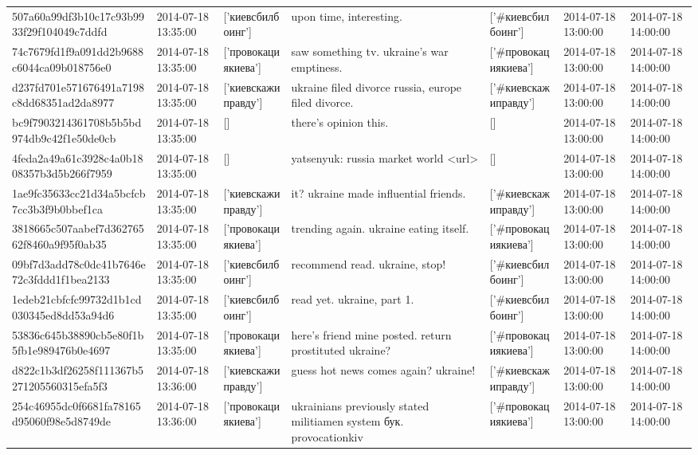\begin{tabular}{lllllll}
507a60a99df3b10c17c93b9933f29f104049c7ddfd & 2014-07-18 13:35:00 & ['киевсбилбоинг'] & upon time, interesting. & ['#киевсбилбоинг'] & 2014-07-18 13:00:00 & 2014-07-18 14:00:00 \\
74c7679fd1f9a091dd2b9688c6044ca09b018756e0 & 2014-07-18 13:35:00 & ['провокациякиева'] & saw something tv. ukraine's war emptiness. & ['#провокациякиева'] & 2014-07-18 13:00:00 & 2014-07-18 14:00:00 \\
d237fd701e571676491a7198c8dd68351ad2da8977 & 2014-07-18 13:35:00 & ['киевскажиправду'] & ukraine filed divorce russia, europe filed divorce. & ['#киевскажиправду'] & 2014-07-18 13:00:00 & 2014-07-18 14:00:00 \\
bc9f7903214361708b5b5bd974db9c42f1e50de0cb & 2014-07-18 13:35:00 & [] & there's opinion this. & [] & 2014-07-18 13:00:00 & 2014-07-18 14:00:00 \\
4feda2a49a61c3928c4a0b1808357b3d5b266f7959 & 2014-07-18 13:35:00 & [] & yatsenyuk: russia market world <url> & [] & 2014-07-18 13:00:00 & 2014-07-18 14:00:00 \\
1ae9fc35633cc21d34a5bcfcb7cc3b3f9b0bbef1ca & 2014-07-18 13:35:00 & ['киевскажиправду'] & it? ukraine made influential friends. & ['#киевскажиправду'] & 2014-07-18 13:00:00 & 2014-07-18 14:00:00 \\
3818665c507aabef7d36276562f8460a9f95f0ab35 & 2014-07-18 13:35:00 & ['провокациякиева'] & trending again. ukraine eating itself. & ['#провокациякиева'] & 2014-07-18 13:00:00 & 2014-07-18 14:00:00 \\
09bf7d3add78c0dc41b7646e72c3fddd1f1bea2133 & 2014-07-18 13:35:00 & ['киевсбилбоинг'] & recommend read. ukraine, stop! & ['#киевсбилбоинг'] & 2014-07-18 13:00:00 & 2014-07-18 14:00:00 \\
1edeb21cbfcfc99732d1b1cd030345ed8dd53a94d6 & 2014-07-18 13:35:00 & ['киевсбилбоинг'] & read yet. ukraine, part 1. & ['#киевсбилбоинг'] & 2014-07-18 13:00:00 & 2014-07-18 14:00:00 \\
53836c645b38890cb5e80f1b5fb1e989476b0e4697 & 2014-07-18 13:35:00 & ['провокациякиева'] & here's friend mine posted. return prostituted ukraine? & ['#провокациякиева'] & 2014-07-18 13:00:00 & 2014-07-18 14:00:00 \\
d822c1b3df26258f111367b5271205560315efa5f3 & 2014-07-18 13:36:00 & ['киевскажиправду'] & guess hot news comes again? ukraine! & ['#киевскажиправду'] & 2014-07-18 13:00:00 & 2014-07-18 14:00:00 \\
254c46955dc0f6681fa78165d95060f98e5d8749de & 2014-07-18 13:36:00 & ['провокациякиева'] & ukrainians previously stated militiamen system бук. provocationkiv & ['#провокациякиева'] & 2014-07-18 13:00:00 & 2014-07-18 14:00:00 \\

\end{tabular}
